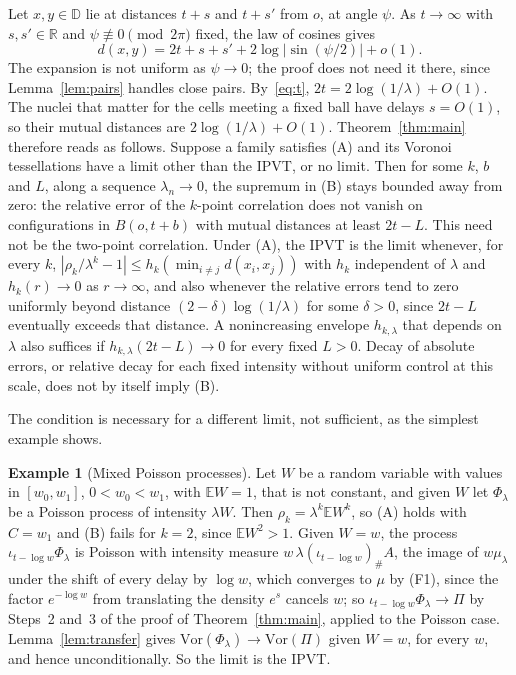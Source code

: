 \documentclass[11pt]{amsart}
\theoremstyle{definition}
\newtheorem{example}[theorem]{Example}
\theoremstyle{remark}
\newcommand{\D}{\mathbb{D}}
\newcommand{\R}{\mathbb{R}}
\newcommand{\E}{\mathbb{E}}
\newcommand{\Vor}{\mathrm{Vor}}
\newcommand{\area}{A}
\begin{document}
Let $x,y\in\D$ lie at distances $t+s$ and $t+s'$ from $o$, at angle $\psi$. As $t\to\infty$ with $s,s'\in\R$ and
$\psi\not\equiv0\pmod{2\pi}$ fixed, the law of cosines gives
\begin{equation}\label{eq:limitdist}
  d(x,y)=2t+s+s'+2\log|\sin(\psi/2)|+o(1).
\end{equation}
The expansion is not uniform as $\psi\to0$; the proof does not need it there, since Lemma~\ref{lem:pairs} handles close
pairs. By~\eqref{eq:t}, $2t=2\log(1/\lambda)+O(1)$. The nuclei that matter for the cells meeting a fixed ball have delays
$s=O(1)$, so their mutual distances are $2\log(1/\lambda)+O(1)$. Theorem~\ref{thm:main} therefore reads as follows.
Suppose a family satisfies (A) and its Voronoi tessellations have a limit other than the IPVT, or no limit. Then for
some $k$, $b$ and $L$, along a sequence $\lambda_n\to0$, the supremum in (B) stays bounded away from zero: the relative
error of the $k$-point correlation does not vanish on configurations in $B(o,t+b)$ with mutual distances at least
$2t-L$. This need not be the two-point correlation. Under (A), the IPVT is the limit whenever, for every $k$,
$|\rho_k/\lambda^k-1|\le h_k(\min_{i\ne j}d(x_i,x_j))$ with $h_k$ independent of $\lambda$ and $h_k(r)\to0$ as
$r\to\infty$, and also whenever the relative errors tend to zero uniformly beyond distance $(2-\delta)\log(1/\lambda)$
for some $\delta>0$, since $2t-L$ eventually exceeds that distance. A nonincreasing envelope $h_{k,\lambda}$ that depends on
$\lambda$ also suffices if $h_{k,\lambda}(2t-L)\to0$ for every fixed $L>0$. Decay of absolute errors, or relative decay for each fixed intensity
without uniform control at this scale, does not by itself imply (B).

The condition is necessary for a different limit, not sufficient, as the simplest example shows.

\begin{example}[Mixed Poisson processes]
Let $W$ be a random variable with values in $[w_0,w_1]$, $0<w_0<w_1$, with $\E W=1$, that is not constant, and given
$W$ let $\Phi_\lambda$ be a Poisson process of intensity $\lambda W$. Then $\rho_k=\lambda^k\E W^k$, so (A) holds with
$C=w_1$ and (B) fails for $k=2$, since $\E W^2>1$. Given $W=w$, the process $\iota_{t-\log w}\Phi_\lambda$ is Poisson with
intensity measure $w\,\lambda(\iota_{t-\log w})_\#\area$, the image of $w\mu_\lambda$ under the shift of every delay by
$\log w$, which converges to $\mu$ by (F1), since the factor $e^{-\log w}$ from translating the density $e^s$ cancels
$w$; so $\iota_{t-\log w}\Phi_\lambda\to\Pi$ by Steps~2 and~3 of the proof of Theorem~\ref{thm:main}, applied to the
Poisson case. Lemma~\ref{lem:transfer} gives $\Vor(\Phi_\lambda)\to\Vor(\Pi)$
given $W=w$, for every $w$, and hence unconditionally. So the limit is the IPVT.
\end{example}
\end{document}
